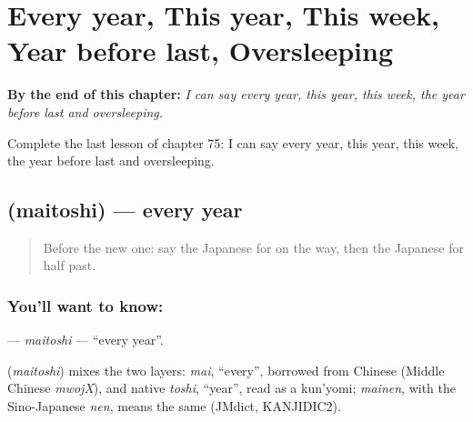 
\chapter{Every year, This year, This week, Year before last, Oversleeping}
\label{ch:ja-every-year-this-year-this-week-year-before-last-oversleeping}

\begin{chapteropening}
\textbf{By the end of this chapter:} \emph{I can say every year, this year, this week, the year before last and oversleeping.}

Complete the last lesson of chapter 75: I can say every year, this year, this week, the year before last and oversleeping.
\end{chapteropening}

\section[\texorpdfstring{\ja{まいとし} (maitoshi)}{まいとし (maitoshi)}]{ (maitoshi) — every year}

\label{lesson:JA-C75-maitoshi}



\begin{quote}
Before the new one: say the Japanese for on the way, then the Japanese for half past.
\end{quote}

\subsection*{You'll want to know: }
\textbf{} — \emph{maitoshi} — \textquotedblleft{}every year\textquotedblright{}.

\begin{cousinweb}
\textbf{} (\emph{maitoshi}) mixes the two layers: \emph{mai}, \textquotedblleft{}every\textquotedblright{}, borrowed from Chinese (Middle Chinese \emph{mwojX}), and native \emph{toshi}, \textquotedblleft{}year\textquotedblright{}, read as a kun'yomi; \emph{mainen}, with the Sino-Japanese \emph{nen}, means the same (JMdict, KANJIDIC2).
\end{cousinweb}

